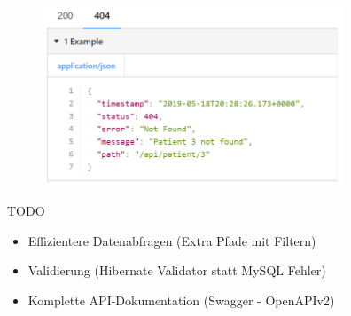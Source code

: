 \documentclass{beamer}
\begin{document}
\begin{frame}
  
  \begin{figure}
    \includegraphics[width=90mm]{GET_404.png}
  \end{figure}
  
\end{frame}

\begin{frame}{TODO}
  
  \begin{itemize}
    \item Effizientere Datenabfragen (Extra Pfade mit Filtern)
    \item Validierung (Hibernate Validator statt MySQL Fehler)
    \item Komplette API-Dokumentation (Swagger - OpenAPIv2)
  \end{itemize}
  
\end{frame}
\end{document}
